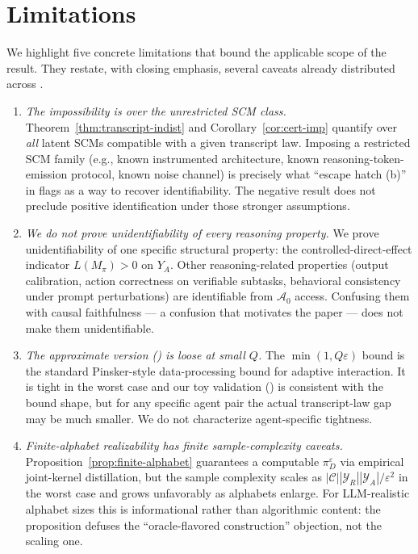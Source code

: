 \documentclass{article}
\theoremstyle{plain}
\theoremstyle{definition}
\theoremstyle{remark}
\newcommand{\C}{\mathcal{C}}
\newcommand{\YR}{\mathcal{Y}_R}
\newcommand{\YA}{\mathcal{Y}_A}
\begin{document}
\section{Limitations}\label{sec:limitations}

We highlight five concrete limitations that bound the applicable scope of the
result. They restate, with closing emphasis, several caveats already
distributed across .

\begin{enumerate}
  \item \emph{The impossibility is over the unrestricted SCM class.}
  Theorem~\ref{thm:transcript-indist} and Corollary~\ref{cor:cert-imp} quantify
  over \emph{all} latent SCMs compatible with a given transcript law. Imposing
  a restricted SCM family (e.g., known instrumented architecture, known
  reasoning-token-emission protocol, known noise channel) is precisely what
  ``escape hatch (b)'' in  flags as a way to recover
  identifiability. The negative result does not preclude positive identification
  under those stronger assumptions.

  \item \emph{We do not prove unidentifiability of every reasoning property.}
  We prove unidentifiability of one specific structural property:
  the controlled-direct-effect indicator $L(M_\pi) > 0$ on $Y_A$. Other
  reasoning-related properties (output calibration, action correctness on
  verifiable subtasks, behavioral consistency under prompt perturbations) are
  identifiable from $\mathcal{A}_0$ access. Confusing them with causal
  faithfulness --- a confusion that motivates the paper --- does not make
  them unidentifiable.

  \item \emph{The approximate version () is loose at small $Q$.}
  The $\min(1, Q\varepsilon)$ bound is the standard Pinsker-style data-processing
  bound for adaptive interaction. It is tight in the worst case and our toy
  validation () is consistent with the bound shape, but
  for any specific agent pair the actual transcript-law gap may be much
  smaller. We do not characterize agent-specific tightness.

  \item \emph{Finite-alphabet realizability has finite sample-complexity caveats.}
  Proposition~\ref{prop:finite-alphabet} guarantees a computable
  $\pi_D^\varepsilon$ via empirical joint-kernel distillation, but the sample
  complexity scales as $|\C| |\YR| |\YA| / \varepsilon^2$ in the worst case
  and grows unfavorably as alphabets enlarge. For LLM-realistic alphabet sizes
  this is informational rather than algorithmic content: the proposition
  defuses the ``oracle-flavored construction'' objection, not the scaling one.


\end{enumerate}
\end{document}
